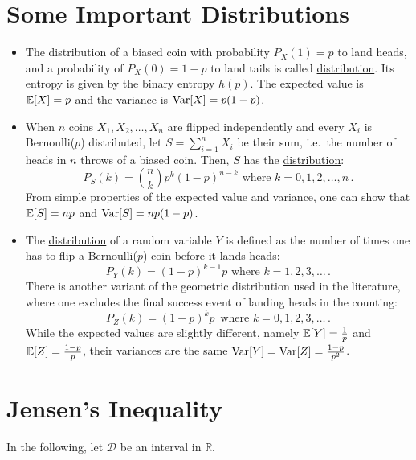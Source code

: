 \section{Some Important Distributions}
\begin{itemize}
\item
The distribution of a biased coin with probability $P_X(1)=p$ to land
heads, and a probability of $P_X(0)=1-p$ to land tails is called
\href{https://en.wikipedia.org/wiki/Bernoulli_distribution}{ distribution}. Its entropy is given by the binary
entropy $h(p)$. The expected value is $\mathbb{E}[X]=p$ and the variance is
$\mathrm{Var}[X]=p(1-p)$.
\item
When $n$ coins $X_1, X_2, \ldots, X_n$ are flipped independently and
every $X_i$ is Bernoulli($p$) distributed, let $S=\sum_{i=1}^n X_i$ be
their sum, i.e.\ the number of heads in $n$ throws of a biased
coin. Then, $S$ has the \href{https://en.wikipedia.org/wiki/Binomial_distribution}{ distribution}:
\[
P_S(k) = \binom{n}{k} p^k (1-p)^{n-k} \mbox{ where } k=0,1,2,\ldots,n
\, .
\] 
From simple properties of the expected value and variance, one can
show that $\mathbb{E}[S]=np$ and $\mathrm{Var}[S]=np(1-p)$.
\item
The
\href{https://en.wikipedia.org/wiki/Geometric_distribution}{
  distribution} of a random variable $Y$ is defined as the number of
times one has to flip a Bernoulli($p$) coin before it lands heads:
\[ P_Y(k) = (1-p)^{k-1} p \mbox{ where } k=1,2,3,\ldots \, .
\]
There is another variant of the geometric distribution used in the literature,
where one excludes the final success event of landing
heads in the counting:
\[
P_Z(k) = (1-p)^k p \,  \mbox{ where } k=0,1,2,3,\ldots \, .
\] 
While the expected values are slightly different, namely
$\mathbb{E}[Y]=\frac{1}{p}$ and $\mathbb{E}[Z]=\frac{1-p}{p}$, their variances are
the same $\mathrm{Var}[Y]=\mathrm{Var}[Z]=\frac{1-p}{p^2}$.
\end{itemize}

\section{Jensen's Inequality}
In the following, let $\mathcal{D}$ be an interval in $\mathbb{R}$.

